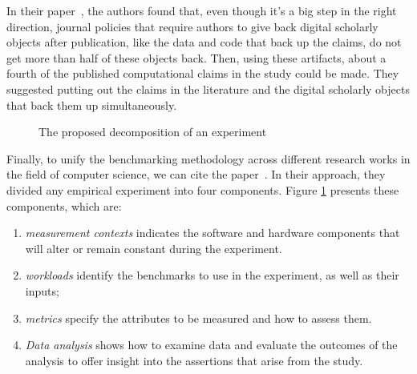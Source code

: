 In their paper~\cite{stodden2018empirical}, the authors found that, even though it's a big step in the right direction, journal policies that require authors to give back digital scholarly objects after publication, like the data and code that back up the claims, do not get more than half of these objects back.
Then, using these artifacts, about a fourth of the published computational claims in the study could be made.
They suggested putting out the claims in the literature and the digital scholarly objects that back them up simultaneously.

\begin{figure}[!hbt]
    \caption{The proposed decomposition of an experiment~\cite{stephen_evaluate_2012}}\label{fig:soa_expermiment_component}
\end{figure}
Finally, to unify the benchmarking methodology across different research works in the field of computer science, we can cite the paper~\cite{stephen_evaluate_2012}.
In their approach, they divided any empirical experiment into four components.
Figure \ref{fig:soa_expermiment_component} presents these components, which are:
\begin{enumerate}
    \item \emph{measurement contexts} indicates the software and hardware components that will alter or remain constant during the experiment.
    \item \emph{workloads}  identify the benchmarks to use in the experiment, as well as their inputs;
    \item \emph{metrics} specify the attributes to be measured and how to assess them.
    \item \emph{Data analysis} shows how to examine data and evaluate the outcomes of the analysis to offer insight into the assertions that arise from the study.
\end{enumerate}

